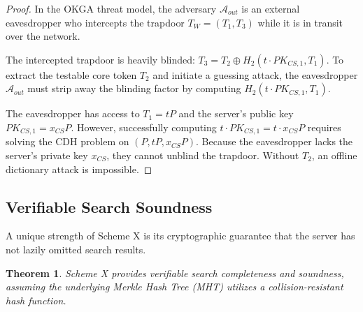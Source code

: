 \documentclass[10pt,journal,compsoc]{IEEEtran}
\newtheorem{theorem}{Theorem}
\begin{document}
\begin{proof}
In the OKGA threat model, the adversary $\mathcal{A}_{out}$ is an external eavesdropper who intercepts the trapdoor $T_W = (T_1, T_3)$ while it is in transit over the network. 

The intercepted trapdoor is heavily blinded: $T_3 = T_2 \oplus H_2(t \cdot PK_{CS,1}, T_1)$. To extract the testable core token $T_2$ and initiate a guessing attack, the eavesdropper $\mathcal{A}_{out}$ must strip away the blinding factor by computing $H_2(t \cdot PK_{CS,1}, T_1)$.

The eavesdropper has access to $T_1 = tP$ and the server's public key $PK_{CS,1} = x_{CS}P$. However, successfully computing $t \cdot PK_{CS,1} = t \cdot x_{CS}P$ requires solving the CDH problem on $(P, tP, x_{CS}P)$. Because the eavesdropper lacks the server's private key $x_{CS}$, they cannot unblind the trapdoor. Without $T_2$, an offline dictionary attack is impossible.
\end{proof}

\subsection{Verifiable Search Soundness}
A unique strength of Scheme X is its cryptographic guarantee that the server has not lazily omitted search results.

\begin{theorem}
Scheme X provides verifiable search completeness and soundness, assuming the underlying Merkle Hash Tree (MHT) utilizes a collision-resistant hash function.
\end{theorem}
\end{document}
